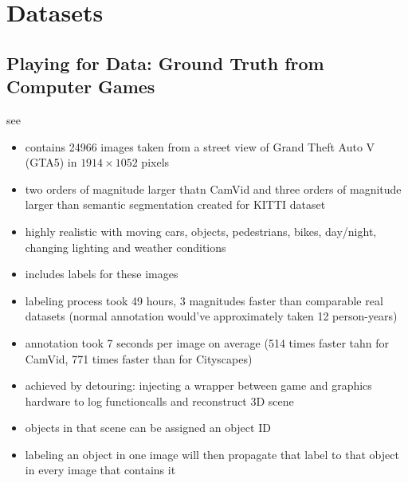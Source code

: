 \chapter{Datasets}
\label{sec:datasets}

\section{Playing for Data: Ground Truth from Computer Games}
see \cite{Richter_2016_ECCV}

\begin{itemize}
	\item contains 24966 images taken from a street view of Grand Theft Auto V (GTA5) in $1914 \times 1052$ pixels
	\item two orders of magnitude larger thatn CamVid and three orders of magnitude larger than semantic segmentation created for KITTI dataset
	\item highly realistic with moving cars, objects, pedestrians, bikes, day/night, changing lighting and weather conditions
	\item includes labels for these images
	\item labeling process took 49 hours, 3 magnitudes faster than comparable real datasets (normal annotation would've approximately taken 12 person-years)
	\item annotation took 7 seconds per image on average (514 times faster tahn for CamVid, 771 times faster than for Cityscapes)
	\item achieved by detouring: injecting a wrapper between game and graphics hardware to log functioncalls and reconstruct 3D scene
	\item objects in that scene can be assigned an object ID
	\item labeling an object in one image will then propagate that label to that object in every image that contains it
\end{itemize}

